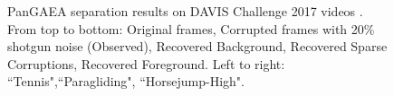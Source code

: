 \documentclass[10pt,twocolumn,letterpaper]{article}
\begin{document}
\begin{figure}
\begin{center}
\caption{PanGAEA separation results on DAVIS Challenge 2017 videos \cite{DAVIS}. From top to bottom: Original frames, Corrupted frames with 20\% shotgun noise (Observed), Recovered Background, Recovered Sparse Corruptions, Recovered Foreground. Left to right: ``Tennis",``Paragliding", ``Horsejump-High".}
    \label{fig:decomp-frames}
    \end{center}
\end{figure}
\end{document}
